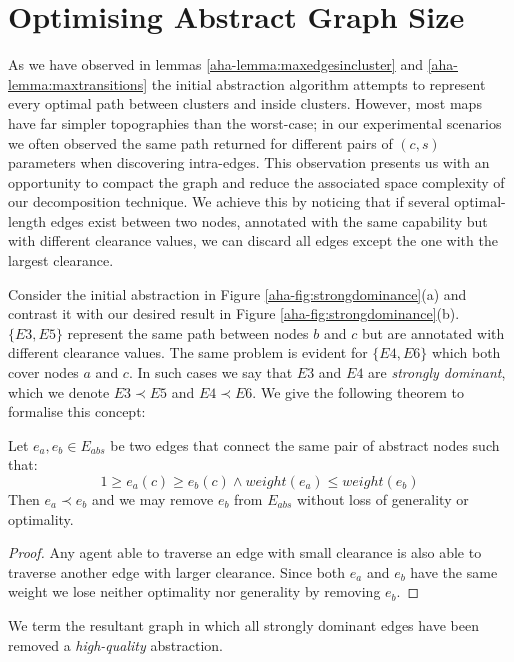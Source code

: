 \section{Optimising Abstract Graph Size}
\par \indent
As we have observed in lemmas \ref{aha-lemma:maxedgesincluster} and \ref{aha-lemma:maxtransitions} the initial abstraction algorithm attempts to represent every optimal path between clusters and inside clusters.
However, most maps have far simpler topographies than the worst-case; in our  experimental scenarios we often observed the same path returned for different pairs of $(c, s)$ parameters when discovering intra-edges.
This observation presents us with an opportunity to compact the graph and reduce the associated space complexity of our decomposition technique. 
We achieve this by noticing that if several optimal-length edges exist between two nodes, annotated with the same capability but with different clearance values, we can discard all edges except the one with the largest clearance. 
\par \indent
Consider the initial abstraction in Figure \ref{aha-fig:strongdominance}(a) and contrast it with our desired result in Figure \ref{aha-fig:strongdominance}(b). $\lbrace E3, E5 \rbrace$ represent the same path between nodes $b$ and $c$ but are annotated with different clearance values. 
The same problem is evident for $\lbrace E4, E6 \rbrace$ which both cover nodes $a$ and $c$. In such cases we say that $E3$ and $E4$ are \emph{strongly dominant}, which we denote $E3 \prec E5$ and $E4 \prec E6$. We give the following theorem to formalise this concept:

\begin{theorem}
\label{aha-definition:strongdominance}
Let $e_{a}, e_{b} \in E_{abs}$ be two edges that connect the same pair of abstract nodes such that:
$$ 1 \geq e_{a}(c) \geq e_{b}(c) \wedge weight(e_{a}) \leq weight(e_{b})$$
Then $e_{a} \prec e_{b}$ and we may remove $e_{b}$ from $E_{abs}$ without loss of generality or optimality.
\end{theorem}
\begin{proof}
Any agent able to traverse an edge with small clearance is also able to traverse another edge with larger clearance. Since both $e_{a}$ and $e_{b}$ have the same weight we lose neither optimality nor generality by removing $e_{b}$.
\end{proof}
We term the resultant graph in which all strongly dominant edges have been removed a \emph{high-quality} abstraction.  

